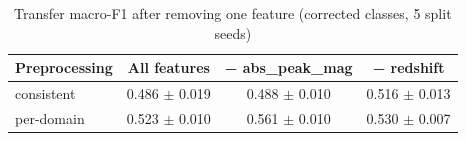 \begin{table}
\centering
\caption{Transfer macro-F1 after removing one feature (corrected classes, 5 split seeds)}
\begin{tabular}{lccc}
\hline
Preprocessing & All features & − abs\_peak\_mag & − redshift \\
\hline
consistent & 0.486 $\pm$ 0.019 & 0.488 $\pm$ 0.010 & 0.516 $\pm$ 0.013 \\
per-domain & 0.523 $\pm$ 0.010 & 0.561 $\pm$ 0.010 & 0.530 $\pm$ 0.007 \\
\hline
\end{tabular}
\end{table}
